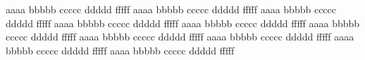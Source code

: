 aaaa	bbbbb	ccccc	ddddd	fffff	
aaaa	bbbbb	ccccc	ddddd	fffff	
aaaa	bbbbb	ccccc	ddddd	fffff	
aaaa	bbbbb	ccccc	ddddd	fffff	
aaaa	bbbbb	ccccc	ddddd	fffff	
aaaa	bbbbb	ccccc	ddddd	fffff	
aaaa	bbbbb	ccccc	ddddd	fffff	
aaaa	bbbbb	ccccc	ddddd	fffff	
aaaa	bbbbb	ccccc	ddddd	fffff	
aaaa	bbbbb	ccccc	ddddd	fffff	
